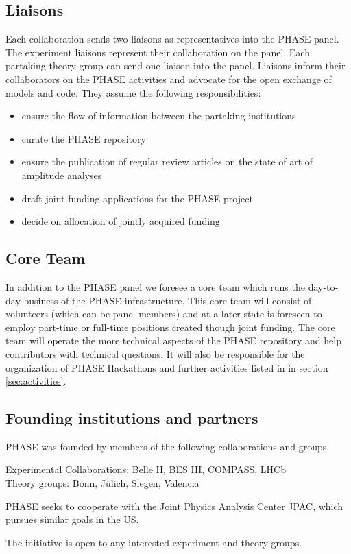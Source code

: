\subsection{Liaisons}
Each collaboration sends two liaisons as representatives into the PHASE panel. The experiment liaisons represent their collaboration on the panel. Each partaking theory group can send one liaison into the panel. Liaisons inform their collaborators on the PHASE activities and advocate for the open exchange of models and code. They assume the following responsibilities:
\begin{itemize}
\item ensure the flow of information between the partaking institutions
\item curate the PHASE repository
\item ensure the publication of regular review articles on the state of art of amplitude analyses
\item draft joint funding applications for the PHASE project
\item decide on allocation of jointly acquired funding
\end{itemize}

\subsection{Core Team}
In addition to the PHASE panel we foresee a core team which runs the day-to-day business of the PHASE infrastructure. This core team will consist of volunteers (which can be panel members) and at a later state is foreseen to employ part-time or full-time positions created though joint funding. The core team will operate the more technical aspects of the PHASE repository and help contributors with technical questions. It will also be responsible for the organization of PHASE Hackathons and further activities listed in in section \ref{sec:activities}.

\subsection{Founding institutions and partners}
PHASE was founded by members of the following collaborations and groups.

Experimental Collaborations: Belle II, BES III, COMPASS, LHCb \\
Theory groups: Bonn, J\"ulich, Siegen, Valencia

PHASE seeks to cooperate with the Joint Physics Analysis Center \href{https://jpac.jlab.org/}{JPAC}, which pursues similar goals in the US.

The initiative is open to any interested experiment and theory groups.